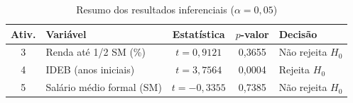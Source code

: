\begin{table}[htbp]
\centering
\caption{Resumo dos resultados inferenciais ($\alpha=0{,}05$)}
\label{tab:inferencia}
\scriptsize
\setlength{\tabcolsep}{2pt}
\begin{tabular}{c p{} c c p{}}
\toprule
\textbf{Ativ.} & \textbf{Variável} & \textbf{Estatística} & \textbf{$p$-valor} & \textbf{Decisão} \\
\midrule
3 & Renda até 1/2 SM (\%) & $t=0,9121$ & 0,3655 & Não rejeita $H_0$ \\
4 & IDEB (anos iniciais) & $t=3,7564$ & 0,0004 & Rejeita $H_0$ \\
5 & Salário médio formal (SM) & $t=-0,3355$ & 0,7385 & Não rejeita $H_0$ \\
\bottomrule
\end{tabular}
\end{table}
